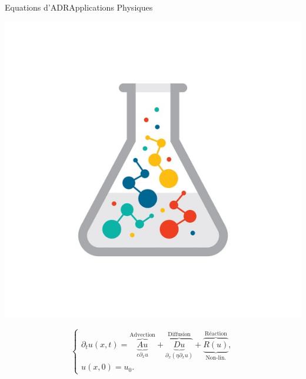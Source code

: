 \begin{frame}{Equations d'ADR}{Applications Physiques}
\begin{center}
    \includegraphics[height=0.4\textheight]{medias/1_/chemical_reaction.png}
\end{center}
\pause
    \begin{equation}
        \begin{cases}
            \partial_t u(x,t) = 
                \overbrace{\underbrace{A u}_{c \partial_x u}}^{\text{Advection}}+ 
                \overbrace{\underbrace{D u}_{\partial_x(\eta \partial_x u)}}^{\text{Diffusion}}+ 
                \overbrace{\underbrace{R(u)}_{\text{Non-lin.}}}^{\text{Réaction}},\\[4pt]
            u(x,0)=u_0.
        \end{cases}
    \end{equation}

\end{frame}